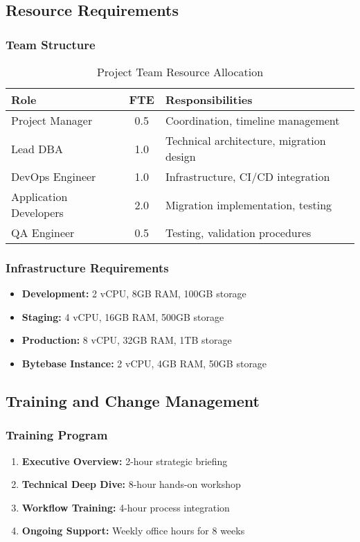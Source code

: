 \subsection{Resource Requirements}

\subsubsection{Team Structure}
\begin{table}[H]
\centering
\begin{tabular}{|l|c|l|}
\hline
\textbf{Role} & \textbf{FTE} & \textbf{Responsibilities} \\
\hline
Project Manager & 0.5 & Coordination, timeline management \\
\hline
Lead DBA & 1.0 & Technical architecture, migration design \\
\hline
DevOps Engineer & 1.0 & Infrastructure, CI/CD integration \\
\hline
Application Developers & 2.0 & Migration implementation, testing \\
\hline
QA Engineer & 0.5 & Testing, validation procedures \\
\hline
\end{tabular}
\caption{Project Team Resource Allocation}
\label{tab:resources}
\end{table}

\subsubsection{Infrastructure Requirements}
\begin{itemize}
    \item \textbf{Development:} 2 vCPU, 8GB RAM, 100GB storage
    \item \textbf{Staging:} 4 vCPU, 16GB RAM, 500GB storage
    \item \textbf{Production:} 8 vCPU, 32GB RAM, 1TB storage
    \item \textbf{Bytebase Instance:} 2 vCPU, 4GB RAM, 50GB storage
\end{itemize}

\subsection{Training and Change Management}

\subsubsection{Training Program}
\begin{enumerate}
    \item \textbf{Executive Overview:} 2-hour strategic briefing
    \item \textbf{Technical Deep Dive:} 8-hour hands-on workshop
    \item \textbf{Workflow Training:} 4-hour process integration
    \item \textbf{Ongoing Support:} Weekly office hours for 8 weeks
\end{enumerate}

